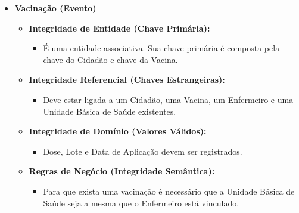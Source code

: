 \documentclass[12pt, a4paper]{article}
\begin{document}
\begin{itemize}
    \item \textbf{Vacinação (Evento)}
    \begin{itemize}
        \item \textbf{Integridade de Entidade (Chave Primária):}
        \begin{itemize}
            \item É uma entidade associativa. Sua chave primária é composta pela chave do Cidadão e chave da Vacina.
        \end{itemize}
        \item \textbf{Integridade Referencial (Chaves Estrangeiras):}
        \begin{itemize}
            \item Deve estar ligada a um Cidadão, uma Vacina, um Enfermeiro e uma Unidade Básica de Saúde existentes.
        \end{itemize}
        \item \textbf{Integridade de Domínio (Valores Válidos):}
        \begin{itemize}
            \item Dose, Lote e Data de Aplicação devem ser registrados.
        \end{itemize}
        \item \textbf{Regras de Negócio (Integridade Semântica):}
        \begin{itemize}
            \item Para que exista uma vacinação é necessário que a Unidade Básica de Saúde seja a mesma que o Enfermeiro está vinculado.
        \end{itemize}
    \end{itemize}


\end{itemize}
\end{document}
